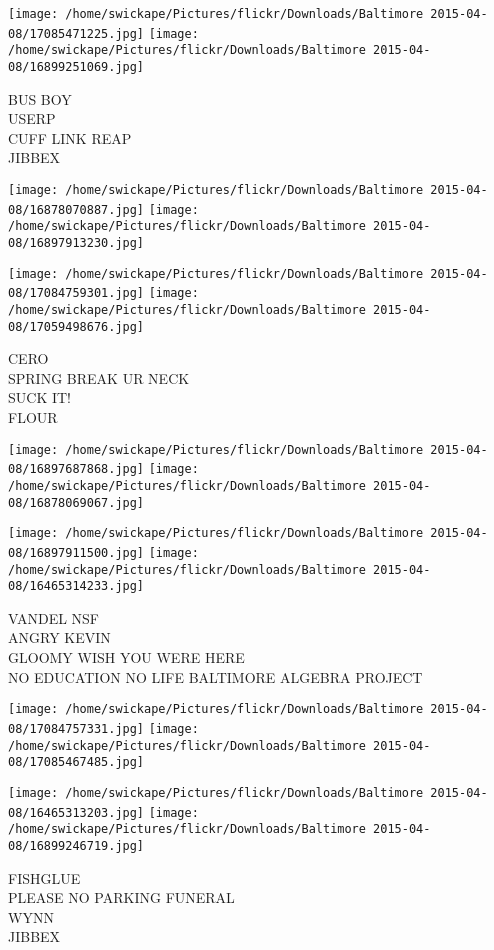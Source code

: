\documentclass[10pt,letterpaper]{article}
\begin{document}
\texttt{[image: /home/swickape/Pictures/flickr/Downloads/Baltimore 2015-04-08/17085471225.jpg]}
\texttt{[image: /home/swickape/Pictures/flickr/Downloads/Baltimore 2015-04-08/16899251069.jpg]}

BUS BOY\\
USERP\\
CUFF LINK REAP\\
JIBBEX
\pagebreak

\texttt{[image: /home/swickape/Pictures/flickr/Downloads/Baltimore 2015-04-08/16878070887.jpg]}
\texttt{[image: /home/swickape/Pictures/flickr/Downloads/Baltimore 2015-04-08/16897913230.jpg]}

\texttt{[image: /home/swickape/Pictures/flickr/Downloads/Baltimore 2015-04-08/17084759301.jpg]}
\texttt{[image: /home/swickape/Pictures/flickr/Downloads/Baltimore 2015-04-08/17059498676.jpg]}

CERO\\
SPRING BREAK UR NECK\\
SUCK IT!\\
FLOUR
\pagebreak

\texttt{[image: /home/swickape/Pictures/flickr/Downloads/Baltimore 2015-04-08/16897687868.jpg]}
\texttt{[image: /home/swickape/Pictures/flickr/Downloads/Baltimore 2015-04-08/16878069067.jpg]}

\texttt{[image: /home/swickape/Pictures/flickr/Downloads/Baltimore 2015-04-08/16897911500.jpg]}
\texttt{[image: /home/swickape/Pictures/flickr/Downloads/Baltimore 2015-04-08/16465314233.jpg]}

VANDEL NSF\\
ANGRY KEVIN\\
GLOOMY WISH YOU WERE HERE\\
NO EDUCATION NO LIFE BALTIMORE ALGEBRA PROJECT
\pagebreak

\texttt{[image: /home/swickape/Pictures/flickr/Downloads/Baltimore 2015-04-08/17084757331.jpg]}
\texttt{[image: /home/swickape/Pictures/flickr/Downloads/Baltimore 2015-04-08/17085467485.jpg]}

\texttt{[image: /home/swickape/Pictures/flickr/Downloads/Baltimore 2015-04-08/16465313203.jpg]}
\texttt{[image: /home/swickape/Pictures/flickr/Downloads/Baltimore 2015-04-08/16899246719.jpg]}

FISHGLUE\\
PLEASE NO PARKING FUNERAL\\
WYNN\\
JIBBEX
\pagebreak
\end{document}
